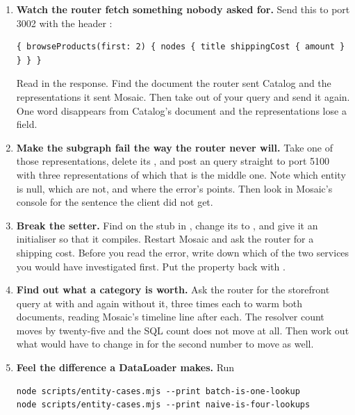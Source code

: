 \begin{enumerate}
  \item \textbf{Watch the router fetch something nobody asked for.} Send this
  to port 3002 with the header :

  \begin{verbatim}
{ browseProducts(first: 2) { nodes { title shippingCost { amount } } } }
  \end{verbatim}

  Read  in the response. Find the document the
  router sent Catalog and the representations it sent Mosaic. Then take
   out of your query and send it again. One word disappears
  from Catalog's document and the representations lose a field.

  \item \textbf{Make the subgraph fail the way the router never will.} Take one
  of those representations, delete its , and post an
   query straight to port 5100 with three representations of
  which that is the middle one. Note which entity is null, which are not, and
  where the error's  points. Then look in Mosaic's console for the
  sentence the client did not get.

  \item \textbf{Break the setter.} Find  on the 
  stub in , change its  to
  , and give it an initialiser so that it compiles. Restart
  Mosaic and ask the router for a shipping cost. Before you read the error,
  write down which of the two services you would have investigated first. Put
  the property back with .

  \item \textbf{Find out what a category is worth.} Ask the router for the
  storefront query at  with  and again
  without it, three times each to warm both documents, reading Mosaic's
  timeline line after each. The resolver count moves by twenty-five and the SQL
  count does not move at all. Then work out what would have to change in
   for the second number to move as well.

  \item \textbf{Feel the difference a DataLoader makes.} Run

  \begin{verbatim}
node scripts/entity-cases.mjs --print batch-is-one-lookup
node scripts/entity-cases.mjs --print naive-is-four-lookups
  \end{verbatim}


\end{enumerate}
